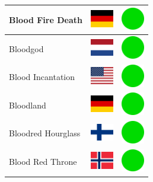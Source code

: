 \documentclass[12pt, a4paper, twoside]{report}
\begin{document}
\begin{center}
\begin{longtable}{|p{5cm}|p{2cm}|p{2cm}|}
Blood Fire Death & \includegraphics[width=1cm]{4x3/de} & \includegraphics[width=1cm]{likes/y} \\ \hline
Bloodgod & \includegraphics[width=1cm]{4x3/nl} & \includegraphics[width=1cm]{likes/y} \\ \hline
Blood Incantation & \includegraphics[width=1cm]{4x3/us} & \includegraphics[width=1cm]{likes/y} \\ \hline
Bloodland & \includegraphics[width=1cm]{4x3/de} & \includegraphics[width=1cm]{likes/y} \\ \hline
Bloodred Hourglass & \includegraphics[width=1cm]{4x3/fi} & \includegraphics[width=1cm]{likes/y} \\ \hline
Blood Red Throne & \includegraphics[width=1cm]{4x3/no} & \includegraphics[width=1cm]{likes/y} \\ \hline

\end{longtable}
\end{center}
\end{document}
